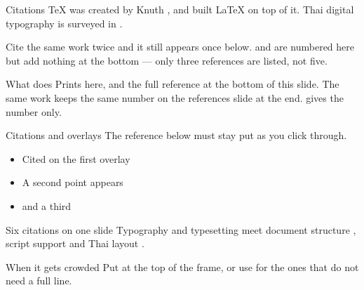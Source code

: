 \begin{frame}{Citations}
  \TeX{} was created by Knuth \cite{knuth1984}, and \cite{lamport1994} built
  \LaTeX{} on top of it. Thai digital typography is surveyed
  in \cite{tantisiriwat2020}.

  \vspace{0.6em}
  Cite the same work twice \cite{knuth1984} and it still appears once below.
   and \cite*{bringhurst2012} are numbered here but
  add nothing at the bottom --- only three references are listed, not five.

  \begin{block}{What  does}
    Prints \code{[n]} here, and the full reference at the bottom of this
    slide. The same work keeps the same number on the references slide at the
    end.  gives the number only.
  \end{block}
\end{frame}

\begin{frame}{Citations and overlays}
  The reference below must stay put as you click through.

  \begin{itemize}
    \item<1-> Cited on the first overlay \cite{bringhurst2012}
    \item<2-> A second point appears
    \item<3-> and a third
  \end{itemize}

  \vspace{0.6em}

\end{frame}

\begin{frame}{Six citations on one slide}
  Typography \cite{bringhurst2012} and typesetting \cite{knuth1984,lamport1994}
  meet document structure \cite{mittelbach2021}, script support
  \cite{unicode2024} and Thai layout \cite{tantisiriwat2020}.

  \begin{block}{When it gets crowded}
    Put  at the top of the frame, or use
     for the ones that do not need a full line.
  \end{block}
\end{frame}

